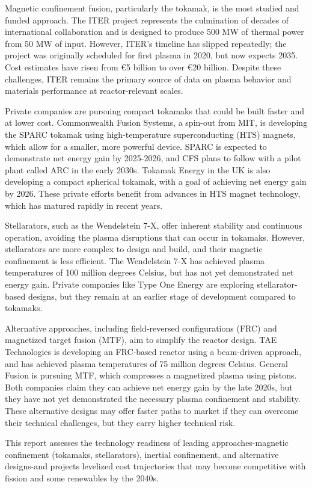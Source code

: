 \documentclass[10pt,a4paper]{article}
\begin{document}
{\small Magnetic confinement fusion, particularly the tokamak, is the most studied and funded approach. The ITER project represents the culmination of decades of international collaboration and is designed to produce 500 MW of thermal power from 50 MW of input. However, ITER's timeline has slipped repeatedly; the project was originally scheduled for first plasma in 2020, but now expects 2035. Cost estimates have risen from €5 billion to over €20 billion. Despite these challenges, ITER remains the primary source of data on plasma behavior and materials performance at reactor-relevant scales.}\par
{\small Private companies are pursuing compact tokamaks that could be built faster and at lower cost. Commonwealth Fusion Systems, a spin-out from MIT, is developing the SPARC tokamak using high-temperature superconducting (HTS) magnets, which allow for a smaller, more powerful device. SPARC is expected to demonstrate net energy gain by 2025-2026, and CFS plans to follow with a pilot plant called ARC in the early 2030s. Tokamak Energy in the UK is also developing a compact spherical tokamak, with a goal of achieving net energy gain by 2026. These private efforts benefit from advances in HTS magnet technology, which has matured rapidly in recent years.}\par
{\small Stellarators, such as the Wendelstein 7-X, offer inherent stability and continuous operation, avoiding the plasma disruptions that can occur in tokamaks. However, stellarators are more complex to design and build, and their magnetic confinement is less efficient. The Wendelstein 7-X has achieved plasma temperatures of 100 million degrees Celsius, but has not yet demonstrated net energy gain. Private companies like Type One Energy are exploring stellarator-based designs, but they remain at an earlier stage of development compared to tokamaks.}\par
{\small Alternative approaches, including field-reversed configurations (FRC) and magnetized target fusion (MTF), aim to simplify the reactor design. TAE Technologies is developing an FRC-based reactor using a beam-driven approach, and has achieved plasma temperatures of 75 million degrees Celsius. General Fusion is pursuing MTF, which compresses a magnetized plasma using pistons. Both companies claim they can achieve net energy gain by the late 2020s, but they have not yet demonstrated the necessary plasma confinement and stability. These alternative designs may offer faster paths to market if they can overcome their technical challenges, but they carry higher technical risk.}\par
{\small This report assesses the technology readiness of leading approaches-magnetic confinement (tokamaks, stellarators), inertial confinement, and alternative designs-and projects levelized cost trajectories that may become competitive with fission and some renewables by the 2040s.}\par
\label{chap:1:end}
\end{document}
